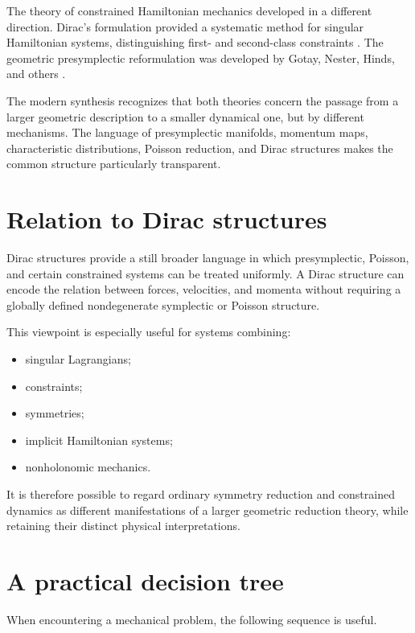 \documentclass[11pt,a4paper]{article}
\theoremstyle{definition}
\begin{document}
The theory of constrained Hamiltonian mechanics developed in a different
direction.  Dirac's formulation provided a systematic method for singular
Hamiltonian systems, distinguishing first- and second-class constraints
\cite{Dirac1950,Dirac1964}.  The geometric presymplectic reformulation was
developed by Gotay, Nester, Hinds, and others
\cite{GotayNesterHinds1978,GotayNester1979}.

The modern synthesis recognizes that both theories concern the passage from
a larger geometric description to a smaller dynamical one, but by different
mechanisms.  The language of presymplectic manifolds, momentum maps,
characteristic distributions, Poisson reduction, and Dirac structures makes
the common structure particularly transparent.

\section{Relation to Dirac structures}

Dirac structures provide a still broader language in which presymplectic,
Poisson, and certain constrained systems can be treated uniformly.  A Dirac
structure can encode the relation between forces, velocities, and momenta
without requiring a globally defined nondegenerate symplectic or Poisson
structure.

This viewpoint is especially useful for systems combining:
\begin{itemize}
\item singular Lagrangians;
\item constraints;
\item symmetries;
\item implicit Hamiltonian systems;
\item nonholonomic mechanics.
\end{itemize}

It is therefore possible to regard ordinary symmetry reduction and constrained
dynamics as different manifestations of a larger geometric reduction theory,
while retaining their distinct physical interpretations.

\section{A practical decision tree}

When encountering a mechanical problem, the following sequence is useful.
\end{document}
